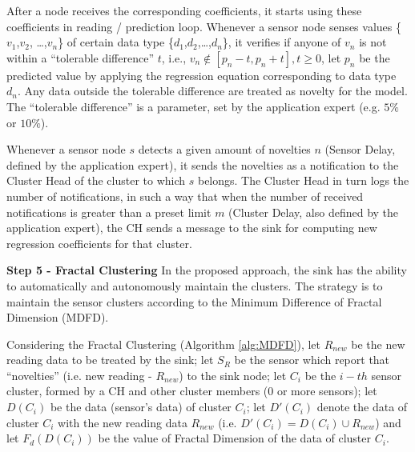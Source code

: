 \documentclass{acm_proc_article-sp}
\begin{document}
After a node receives the corresponding coefficients, it starts using these
coefficients in reading / prediction loop.
Whenever a sensor node senses values \{$v_{1}$,$v_{2}$, \ldots,$v_{n}$\} of
certain data type \{$d_{1}$,$d_{2}$,\ldots,$d_{n}$\}, it verifies if anyone of
$v_{n}$ is not within a ``tolerable difference'' $t$, i.e., $v_{n} \not \in
[p_{n}-t,p_{n}+t], t \geq 0$, let $p_{n}$ be the predicted value by applying
the regression equation corresponding to data type $d_{n}$. Any data outside the
tolerable difference are treated as novelty for the model.
The ``tolerable difference'' is a parameter, set by the application expert (e.g.
$5\%$ or $10\%$).
\vspace*{-.3cm}

Whenever a sensor node $s$ detects a given amount of novelties $n$ (Sensor Delay,
defined by the application expert), it sends the novelties as a notification to
the Cluster Head of the cluster to which $s$ belongs. The Cluster Head in turn
logs the number of notifications, in such a way that when the number of received
notifications is greater than a preset limit $m$ (Cluster Delay, also
defined by the application expert), the CH sends a message to the sink for
computing new regression coefficients for that cluster.
\vspace*{-.3cm}

{\bf Step 5 - Fractal Clustering}
In the proposed approach, the sink has the ability to automatically and
autonomously maintain the clusters. The strategy is to maintain the sensor
clusters according to the Minimum Difference of Fractal Dimension (MDFD).
\vspace*{-.3cm}

Considering the Fractal Clustering (Algorithm \ref{alg:MDFD}), let $R_{new}$ be
the new reading data to be treated by the sink; let $S_{R}$ be the sensor which
report that ``novelties'' (i.e. new reading - $R_{new}$) to the sink node; let
$C_i$ be the $i-th$ sensor cluster, formed by a CH and other cluster members (0
or more sensors); let $D(C_i)$ be the data (sensor's data) of cluster $C_i$; let
$D'(C_i)$ denote the data of cluster $C_i$ with the new reading data $R_{new}$
(i.e. $D'(C_i) = D(C_i) \cup R_{new}$) and let $F_{d}(D(C_i))$ be the value of
Fractal Dimension of the data of cluster $C_i$.
\vspace*{-.6cm}
\end{document}
